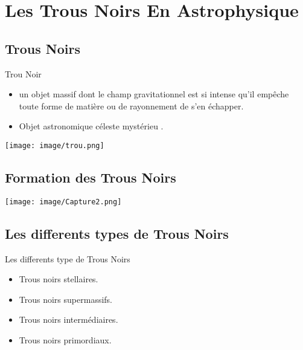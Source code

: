 \documentclass{beamer}
\begin{document}
\begin{frame}
\tableofcontents[pausesections]
\end{frame}


\section{Les Trous Noirs En Astrophysique}
\subsection{Trous Noirs}

\begin{frame}
\begin{block}{Trou Noir }
	\begin{itemize}
		\item   un objet massif dont le champ gravitationnel est si
		intense qu’il empêche toute forme de matière ou de rayonnement de s'en échapper.
		\item    Objet astronomique céleste mystérieu .
	\end{itemize}
\end{block}
\texttt{[image: image/trou.png]}

\end{frame}


\subsection{Formation des Trous Noirs}

\begin{frame}

\texttt{[image: image/Capture2.png]}
\end{frame}

\subsection{Les differents types de Trous Noirs}

\begin{frame}

{Les differents type de Trous Noirs}


	\begin{itemize}
		\item Trous noirs stellaires.
		\item Trous noirs supermassifs.
		\item Trous noirs intermédiaires.
		\item Trous noirs primordiaux. 
	\end{itemize} 
\end{frame}
\end{document}
